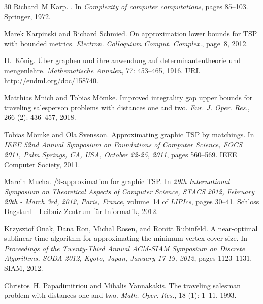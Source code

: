 \documentclass[letterpaper,11pt]{article}
\begin{document}
\begin{thebibliography}{30}
Richard~M Karp.
.
\newblock In \emph{Complexity of computer computations}, pages 85--103.
  Springer, 1972.

Marek Karpinski and Richard Schmied.
\newblock On approximation lower bounds for {TSP} with bounded metrics.
\newblock \emph{Electron. Colloquium Comput. Complex.}, page~8, 2012.

D.~König.
\newblock Über graphen und ihre anwendung auf determinantentheorie und
  mengenlehre.
\newblock \emph{Mathematische Annalen}, 77: 453--465, 1916.
\newblock URL \url{http://eudml.org/doc/158740}.

Matthias Mnich and Tobias M{\"{o}}mke.
\newblock Improved integrality gap upper bounds for traveling salesperson
  problems with distances one and two.
\newblock \emph{Eur. J. Oper. Res.}, 266 (2): 436--457, 2018.

Tobias M{\"{o}}mke and Ola Svensson.
\newblock Approximating graphic {TSP} by matchings.
\newblock In \emph{{IEEE} 52nd Annual Symposium on Foundations of Computer
  Science, {FOCS} 2011, Palm Springs, CA, USA, October 22-25, 2011}, pages
  560--569. {IEEE} Computer Society, 2011.

Marcin Mucha.
/9-approximation for graphic {TSP}.
\newblock In \emph{29th International Symposium on Theoretical Aspects of
  Computer Science, {STACS} 2012, February 29th - March 3rd, 2012, Paris,
  France}, volume~14 of \emph{LIPIcs}, pages 30--41. Schloss Dagstuhl -
  Leibniz-Zentrum f{\"{u}}r Informatik, 2012.

Krzysztof Onak, Dana Ron, Michal Rosen, and Ronitt Rubinfeld.
\newblock A near-optimal sublinear-time algorithm for approximating the minimum
  vertex cover size.
\newblock In \emph{Proceedings of the Twenty-Third Annual {ACM-SIAM} Symposium
  on Discrete Algorithms, {SODA} 2012, Kyoto, Japan, January 17-19, 2012},
  pages 1123--1131. {SIAM}, 2012.

Christos~H. Papadimitriou and Mihalis Yannakakis.
\newblock The traveling salesman problem with distances one and two.
\newblock \emph{Math. Oper. Res.}, 18 (1): 1--11, 1993.


\end{thebibliography}
\end{document}

